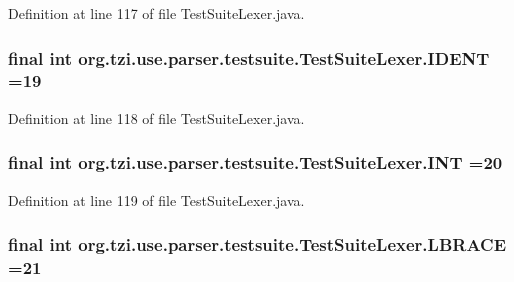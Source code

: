 Definition at line 117 of file Test\-Suite\-Lexer.\-java.

\hypertarget{classorg_1_1tzi_1_1use_1_1parser_1_1testsuite_1_1_test_suite_lexer_a75edc06c00b04e5f6c43298b41697e8b}{
\subsubsection[{I\-D\-E\-N\-T}]{\setlength{\rightskip}{0pt plus 5cm}final int org.\-tzi.\-use.\-parser.\-testsuite.\-Test\-Suite\-Lexer.\-I\-D\-E\-N\-T =19\hspace{0.3cm}{\ttfamily [static]}}}\label{classorg_1_1tzi_1_1use_1_1parser_1_1testsuite_1_1_test_suite_lexer_a75edc06c00b04e5f6c43298b41697e8b}


Definition at line 118 of file Test\-Suite\-Lexer.\-java.

\hypertarget{classorg_1_1tzi_1_1use_1_1parser_1_1testsuite_1_1_test_suite_lexer_aa05688b2c62ad8dc29fbfcf522342f02}{
\subsubsection[{I\-N\-T}]{\setlength{\rightskip}{0pt plus 5cm}final int org.\-tzi.\-use.\-parser.\-testsuite.\-Test\-Suite\-Lexer.\-I\-N\-T =20\hspace{0.3cm}{\ttfamily [static]}}}\label{classorg_1_1tzi_1_1use_1_1parser_1_1testsuite_1_1_test_suite_lexer_aa05688b2c62ad8dc29fbfcf522342f02}


Definition at line 119 of file Test\-Suite\-Lexer.\-java.

\hypertarget{classorg_1_1tzi_1_1use_1_1parser_1_1testsuite_1_1_test_suite_lexer_a46c234cd2bc8b47311f0522381e2acbb}{
\subsubsection[{L\-B\-R\-A\-C\-E}]{\setlength{\rightskip}{0pt plus 5cm}final int org.\-tzi.\-use.\-parser.\-testsuite.\-Test\-Suite\-Lexer.\-L\-B\-R\-A\-C\-E =21\hspace{0.3cm}{\ttfamily [static]}}}\label{classorg_1_1tzi_1_1use_1_1parser_1_1testsuite_1_1_test_suite_lexer_a46c234cd2bc8b47311f0522381e2acbb}


